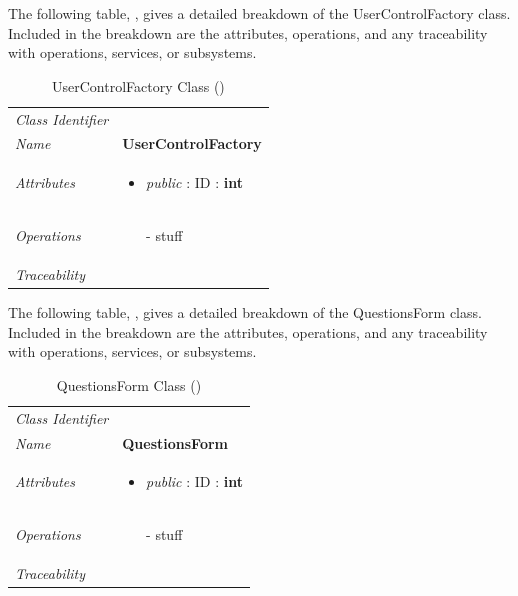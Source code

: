 \documentclass[12pt,letterpaper]{article}
\begin{document}
The following table, , gives a detailed breakdown of the UserControlFactory class. Included in the breakdown are the attributes, operations, and any traceability with operations, services, or subsystems.

\begin{table}[H]
    \caption{UserControlFactory Class ()} 
	\begin{tabu} to 
		\toprule
		Class Identifier &  \\
		Name & {\bf UserControlFactory} \\
		Attributes & 
		\begin{minipage}[t]{\linewidth}
		    \begin{itemize}
		        \item \textit{public} : ID : \bf{int}
			\end{itemize}
	    \end{minipage} \\

		Operations &
		\begin{minipage}[t]{\linewidth}
			\begin{enumerate}
			    \item[-] stuff
	        \end{enumerate}
	    \end{minipage} \\
	    	Traceability & \\
		\toprule
	\end{tabu}
\end{table}

The following table, , gives a detailed breakdown of the QuestionsForm class. Included in the breakdown are the attributes, operations, and any traceability with operations, services, or subsystems.

\begin{table}[H]
    \caption{QuestionsForm Class ()} 
	\begin{tabu} to 
		\toprule
		Class Identifier &  \\
		Name & {\bf QuestionsForm} \\
		Attributes & 
		\begin{minipage}[t]{\linewidth}
		    \begin{itemize}
		        \item \textit{public} : ID : \bf{int}
			\end{itemize}
	    \end{minipage} \\

		Operations &
		\begin{minipage}[t]{\linewidth}
			\begin{enumerate}
			    \item[-] stuff
	        \end{enumerate}
	    \end{minipage} \\
	    	Traceability & \\
		\toprule
	\end{tabu}
\end{table}
\end{document}
